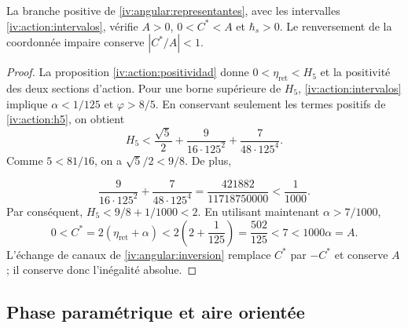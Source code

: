 \begin{proposition}
\label{iv:ellipse:pertenencia}
La branche positive de \eqref{iv:angular:representantes}, avec les
intervalles \eqref{iv:action:intervalos}, vérifie
\(A>0\), \(0<C^*<A\) et \(\hbar_s>0\).
Le renversement de la coordonnée impaire conserve \(|C^*/A|<1\).
\end{proposition}
\begin{proof}
La proposition \ref{iv:action:positividad} donne
\(0<\eta_{\mathrm{ret}}<H_5\) et la positivité des deux
sections d’action. Pour une borne supérieure de \(H_5\),
\eqref{iv:action:intervalos} implique
\(\alpha<1/125\) et \(\varphi>8/5\). En conservant seulement
les termes positifs de \eqref{iv:action:h5}, on obtient
\[
 H_5<
 \frac{\sqrt5}{2}+
 \frac{9}{16\cdot125^2}+
 \frac{7}{48\cdot125^4}.
\]
Comme \(5<81/16\), on a \(\sqrt5/2<9/8\). De plus,

\[
 \frac{9}{16\cdot125^2}+
 \frac{7}{48\cdot125^4}
 =\frac{421882}{11718750000}<\frac1{1000}.
\]
Par conséquent, \(H_5<9/8+1/1000<2\). En utilisant maintenant
\(\alpha>7/1000\),
\[
 0<C^*=2(\eta_{\mathrm{ret}}+\alpha)
 <2\left(2+\frac1{125}\right)=\frac{502}{125}
 <7<1000\alpha=A.
\]
L’échange de canaux de
\ref{iv:angular:inversion} remplace \(C^*\) par \(-C^*\)
et conserve \(A\) ; il conserve donc l’inégalité absolue.

\end{proof}

\subsection{Phase paramétrique et aire orientée}
\label{iv:ellipse:area}

